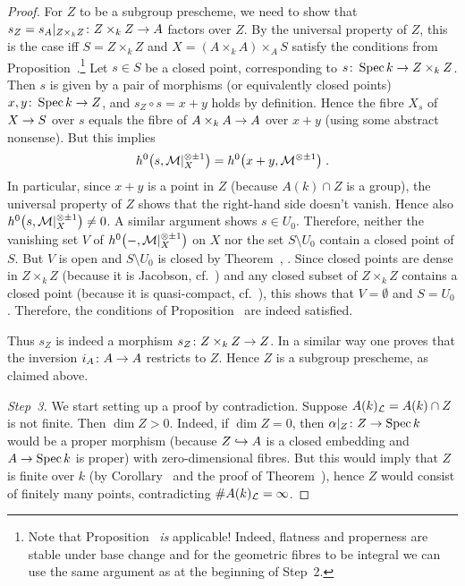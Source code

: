 \documentclass[a4paper,parskip=half,numbers=enddot, DIV=12]{scrreprt}
\begin{document}
\begin{proof}
	 For $Z$ to be a subgroup prescheme, we need to show that $s_Z=s_A|_{Z\times_kZ}\colon Z\times_kZ\morphism A$ factors over $Z$. By the universal property of $Z$, this is the case iff $S=Z\times_kZ$ and $X=(A\times_kA)\times_AS$ satisfy the conditions from Proposition~.\footnote{Note that Proposition~ \emph{is} applicable! Indeed, flatness and properness are stable under base change and for the geometric fibres to be integral we can use the same argument as at the beginning of Step~2.} Let $s\in S$ be a closed point, corresponding to $s\colon \Spec k\morphism Z\times_kZ$. Then $s$ is given by a pair of morphisms (or equivalently closed points) $x,y\colon \Spec k\morphism Z$, and $s_Z\circ s=x+y$ holds by definition. Hence the fibre $X_s$ of $X\morphism S$ over $s$ equals the fibre of $A\times_kA\morphism A$ over $x+y$ (using some abstract nonsense). But this implies
	 \begin{align*}
	 	h^0\big(s,\mathcal{M}|_X^{\otimes \pm1}\big)=h^0\big(x+y,\mathcal{M}^{\otimes \pm 1}\big)\;.
	 \end{align*}
	 In particular, since $x+y$ is a point in $Z$ (because $A(k)\cap Z$ is a group), the universal property of $Z$ shows that the right-hand side doesn't vanish. Hence also $h^0\big(s,\mathcal{M}|_X^{\otimes \pm1}\big)\neq 0$. A similar argument shows $s\in U_0$. Therefore, neither the vanishing set $V$ of $h^0\big(-,\mathcal{M}|_X^{\otimes \pm1}\big)$ on $X$ nor the set $S\setminus U_0$ contain a closed point of $S$. But $V$ is open and $S\setminus U_0$ is closed by Theorem~, . Since closed points are dense in $Z\times_kZ$ (because it is Jacobson, cf.\ \cite[Definition~2.4.2]{alggeo1}) and any closed subset of $Z\times_kZ$ contains a closed point (because it is quasi-compact, cf.\ \cite[Proposition~2.1.1]{alggeo1}), this shows that $V=\emptyset$ and $S=U_0$. Therefore, the conditions of Proposition~ are indeed satisfied.
	 
	 Thus $s_Z$ is indeed a morphism $s_Z\colon Z\times_kZ\morphism Z$. In a similar way one proves that the inversion $i_A\colon A\morphism A$ restricts to $Z$. Hence $Z$ is a subgroup prescheme, as claimed above.
	 
	 \emph{Step~3.} We start setting up a proof by contradiction. Suppose $A(k)_{\mathcal{L}}=A(k)\cap Z$ is not finite. Then $\dim Z>0$. Indeed, if $\dim Z=0$, then $\alpha|_Z\colon Z\morphism\Spec k$ would be a proper morphism (because $Z\monomorphism A$ is a closed embedding and $A\morphism\Spec k$ is proper) with zero-dimensional fibres. But this would imply that $Z$ is finite over $k$ (by Corollary~ and the proof of Theorem~), hence $Z$ would consist of finitely many points, contradicting $\# A(k)_{\mathcal{L}}=\infty$.
	 

\end{proof}
\end{document}
